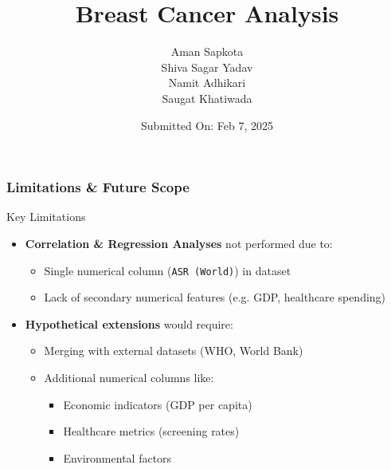 \documentclass{beamer}
\title{Breast Cancer Analysis}
\author{Aman Sapkota \\
Shiva Sagar Yadav \\
Namit Adhikari \\
Saugat Khatiwada}
\date{Submitted On: Feb 7, 2025}
\begin{document}







\begin{frame}[fragile]
  \frametitle{Limitations \& Future Scope}
  \begin{alertblock}{Key Limitations}
      \begin{itemize}
          \item \textbf{Correlation \& Regression Analyses} not performed due to:
          \begin{itemize}
              \item Single numerical column (\texttt{ASR (World)}) in dataset
              \item Lack of secondary numerical features (e.g. GDP, healthcare spending)
          \end{itemize}
          
          \item \textbf{Hypothetical extensions} would require:
          \begin{itemize}
              \item Merging with external datasets (WHO, World Bank)
              \item Additional numerical columns like:
              \begin{itemize}
                  \item Economic indicators (GDP per capita)
                  \item Healthcare metrics (screening rates)
                  \item Environmental factors
              \end{itemize}
          \end{itemize}
      \end{itemize}
  \end{alertblock}
\end{frame}
\end{document}
